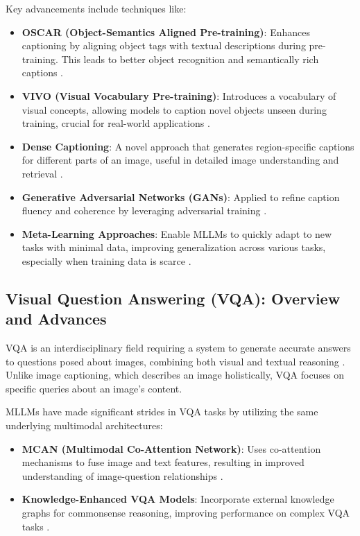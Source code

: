 Key advancements include techniques like:
\begin{itemize}
    \item \textbf{OSCAR (Object-Semantics Aligned Pre-training)}: Enhances captioning by aligning object tags with textual descriptions during pre-training. This leads to better object recognition and semantically rich captions \cite{icmeta2019oscar}.
    \item \textbf{VIVO (Visual Vocabulary Pre-training)}: Introduces a vocabulary of visual concepts, allowing models to caption novel objects unseen during training, crucial for real-world applications \cite{icmeta2019vivo}.
    \item \textbf{Dense Captioning}: A novel approach that generates region-specific captions for different parts of an image, useful in detailed image understanding and retrieval \cite{icmeta2020densecap}.
    \item \textbf{Generative Adversarial Networks (GANs)}: Applied to refine caption fluency and coherence by leveraging adversarial training \cite{icmeta2021gan}.
    \item \textbf{Meta-Learning Approaches}: Enable MLLMs to quickly adapt to new tasks with minimal data, improving generalization across various tasks, especially when training data is scarce \cite{icmeta2019meta}.
\end{itemize}

\subsection{Visual Question Answering (VQA): Overview and Advances}
VQA is an interdisciplinary field requiring a system to generate accurate answers to questions posed about images, combining both visual and textual reasoning \cite{vqa_survey2023}. Unlike image captioning, which describes an image holistically, VQA focuses on specific queries about an image's content.

MLLMs have made significant strides in VQA tasks by utilizing the same underlying multimodal architectures:
\begin{itemize}
    \item \textbf{MCAN (Multimodal Co-Attention Network)}: Uses co-attention mechanisms to fuse image and text features, resulting in improved understanding of image-question relationships \cite{mcan_vqa2019}.
    \item \textbf{Knowledge-Enhanced VQA Models}: Incorporate external knowledge graphs for commonsense reasoning, improving performance on complex VQA tasks \cite{lan2023improvingzeroshotvisualquestion}.
\end{itemize}

